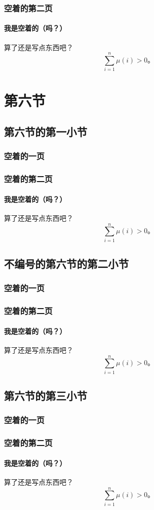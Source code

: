 \documentclass{../pkslide}
\begin{document}
\begin{frame}
  \frametitle{空着的第二页}
  \framesubtitle{我是空着的（吗？）}
  算了还是写点东西吧？
  \[ \sum_{i = 1}^{n} \mu(i) > 0 \text{。} \]
\end{frame}

\section{第六节}

\subsection{第六节的第一小节}

\begin{frame}
  \frametitle{空着的一页}
\end{frame}

\begin{frame}
  \frametitle{空着的第二页}
  \framesubtitle{我是空着的（吗？）}
  算了还是写点东西吧？
  \[ \sum_{i = 1}^{n} \mu(i) > 0 \text{。} \]
\end{frame}

\subsection*{不编号的第六节的第二小节}

\begin{frame}
  \frametitle{空着的一页}
\end{frame}

\begin{frame}
  \frametitle{空着的第二页}
  \framesubtitle{我是空着的（吗？）}
  算了还是写点东西吧？
  \[ \sum_{i = 1}^{n} \mu(i) > 0 \text{。} \]
\end{frame}

\subsection{第六节的第三小节}

\begin{frame}
  \frametitle{空着的一页}
\end{frame}

\begin{frame}
  \frametitle{空着的第二页}
  \framesubtitle{我是空着的（吗？）}
  算了还是写点东西吧？
  \[ \sum_{i = 1}^{n} \mu(i) > 0 \text{。} \]
\end{frame}
\end{document}
